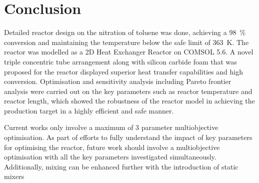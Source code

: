 \section{Conclusion} \label{sec:conclusion}
Detailed reactor design on the nitration of toluene was done, achieving a \SI{98}{\%} conversion and maintaining the temperature below the safe limit of \SI{363}{\K}. The reactor was modelled as a 2D Heat Exchanger Reactor on COMSOL 5.6. A novel triple concentric tube arrangement along with silicon carbide foam that was proposed for the reactor displayed superior heat transfer capabilities and high conversion. Optimisation and sensitivity analysis including Pareto frontier analysis were carried out on the key parameters such as reactor temperature and reactor length, which showed the robustness of the reactor model in achieving the production target in a highly efficient and safe manner. 

Current works only involve a maximum of 3 parameter multiobjective optimisation. As part of efforts to fully understand the impact of key parameters for optimising the reactor, future work should involve a multiobjective optimisation with all the key parameters investigated simultaneously. Additionally, mixing can be enhanced further with the introduction of static mixers 


